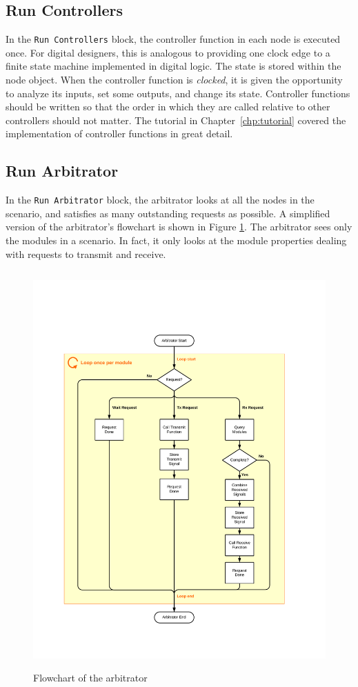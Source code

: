 \subsection{Run Controllers}

In the \verb+Run Controllers+ block, the controller function in each
node is executed once.  For digital designers, this is analogous to
providing one clock edge to a finite state machine implemented in
digital logic.  The state is stored within the node object.  When
the controller function is \emph{clocked}, it is given the
opportunity to analyze its inputs, set some outputs, and change its
state. Controller functions should be written so that the order in
which they are called relative to other controllers should not
matter. The tutorial in Chapter~\ref{chp:tutorial} covered the
implementation of controller functions in great detail.

\subsection{Run Arbitrator} \label{sec:runArbitrator}

In the \verb+Run Arbitrator+ block, the arbitrator looks at all the
nodes in the scenario, and satisfies as many outstanding requests as
possible.  A simplified version of the arbitrator's flowchart is
shown in Figure \ref{fig:arbitFlowchart}.  The arbitrator sees only
the modules in a scenario.  In fact, it only looks at the module
properties dealing with requests to transmit and receive.

\begin{figure}[!h]
\centering
\includegraphics[height=6in]{figs/Arbitrator_Flowchart}
\caption{Flowchart of the arbitrator}
\label{fig:arbitFlowchart}
\end{figure}

